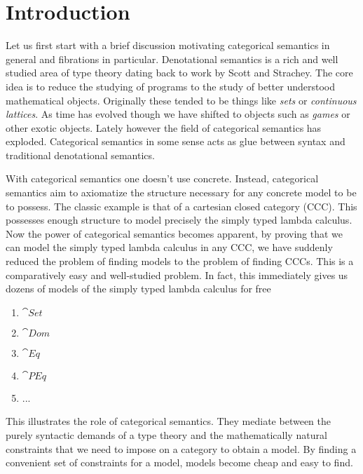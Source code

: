 \section{Introduction}

Let us first start with a brief discussion motivating categorical
semantics in general and fibrations in particular. Denotational
semantics is a rich and well studied area of type theory dating back
to work by Scott and Strachey. The core idea is to reduce the studying
of programs to the study of better understood mathematical
objects. Originally these tended to be things like \emph{sets} or
\emph{continuous lattices}. As time has evolved though we have shifted
to objects such as \emph{games} or other exotic objects. Lately
however the field of categorical semantics has exploded. Categorical
semantics in some sense acts as glue between syntax and traditional
denotational semantics.

With categorical semantics one doesn't use concrete. Instead,
categorical semantics aim to axiomatize the structure necessary for
any concrete model to be to possess. The classic example is that of a
cartesian closed category (CCC). This possesses enough structure to model
precisely the simply typed lambda calculus. Now the power of
categorical semantics becomes apparent, by proving that we can model
the simply typed lambda calculus in any CCC, we have suddenly reduced
the problem of finding models to the problem of finding CCCs. This is
a comparatively easy and well-studied problem. In fact, this
immediately gives us dozens of models of the simply typed lambda
calculus for free
\begin{enumerate}
\item $\cat{Set}$
\item $\cat{Dom}$
\item $\cat{Eq}$
\item $\cat{PEq}$
\item ...
\end{enumerate}
This illustrates the role of categorical semantics. They mediate
between the purely syntactic demands of a type theory and the
mathematically natural constraints that we need to impose on a
category to obtain a model. By finding a convenient set of constraints
for a model, models become cheap and easy to find.

